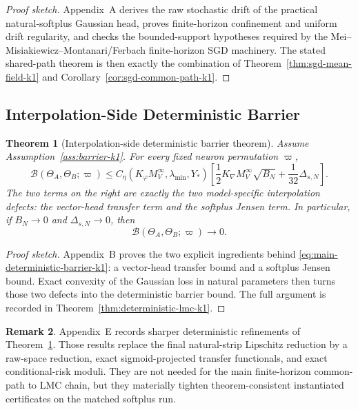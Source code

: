 \documentclass[11pt]{article}
\newtheorem{theorem}{Theorem}
\theoremstyle{definition}
\newtheorem{remark}[theorem]{Remark}
\newcommand{\cB}{\mathcal{B}}
\begin{document}
\begin{proof}[Proof sketch]
Appendix~A derives the raw stochastic drift of the practical natural-softplus
Gaussian head, proves finite-horizon confinement and uniform drift regularity,
and checks the bounded-support hypotheses required by the
Mei--Misiakiewicz--Montanari/Ferbach finite-horizon SGD machinery. The stated
shared-path theorem is then exactly the combination of
Theorem~\ref{thm:sgd-mean-field-k1} and
Corollary~\ref{cor:sgd-common-path-k1}.
\end{proof}

\subsection{Interpolation-Side Deterministic Barrier}

\begin{theorem}[Interpolation-side deterministic barrier theorem]
\label{thm:main-barrier-k1}
Assume Assumption~\ref{ass:barrier-k1}. For every fixed neuron permutation
$\varpi$,
\begin{equation}
  \cB(\Theta_A,\Theta_B;\varpi)
  \le
  C_\eta(K_\varphi M_V^\infty,\lambda_{\min},Y_\ast)
  \left[
    \frac12 K_{\nabla}M_V^\infty\sqrt{B_N}
    +
    \frac1{32}\Delta_{s,N}
  \right].
  \label{eq:main-deterministic-barrier-k1}
\end{equation}
The two terms on the right are exactly the two model-specific interpolation
defects: the vector-head transfer term and the softplus Jensen term. In
particular, if $B_N\to 0$ and $\Delta_{s,N}\to 0$, then
\[
  \cB(\Theta_A,\Theta_B;\varpi)\to 0.
\]
\end{theorem}

\begin{proof}[Proof sketch]
Appendix~B proves the two explicit ingredients behind
\eqref{eq:main-deterministic-barrier-k1}: a vector-head transfer bound and a
softplus Jensen bound. Exact convexity of the Gaussian loss in natural
parameters then turns those two defects into the deterministic barrier bound.
The full argument is recorded in Theorem~\ref{thm:deterministic-lmc-k1}.
\end{proof}

\begin{remark}
Appendix~E records sharper deterministic refinements of
Theorem~\ref{thm:main-barrier-k1}. Those results replace the final
natural-strip Lipschitz reduction by a raw-space reduction, exact
sigmoid-projected transfer functionals, and exact conditional-risk moduli.
They are not needed for the main finite-horizon common-path to LMC chain, but
they materially tighten theorem-consistent instantiated certificates on the
matched softplus run.
\end{remark}
\end{document}
